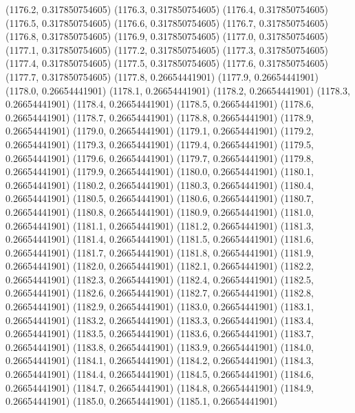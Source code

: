 {					(1176.2, 0.317850754605)
					(1176.3, 0.317850754605)
					(1176.4, 0.317850754605)
					(1176.5, 0.317850754605)
					(1176.6, 0.317850754605)
					(1176.7, 0.317850754605)
					(1176.8, 0.317850754605)
					(1176.9, 0.317850754605)
					(1177.0, 0.317850754605)
					(1177.1, 0.317850754605)
					(1177.2, 0.317850754605)
					(1177.3, 0.317850754605)
					(1177.4, 0.317850754605)
					(1177.5, 0.317850754605)
					(1177.6, 0.317850754605)
					(1177.7, 0.317850754605)
					(1177.8, 0.26654441901)
					(1177.9, 0.26654441901)
					(1178.0, 0.26654441901)
					(1178.1, 0.26654441901)
					(1178.2, 0.26654441901)
					(1178.3, 0.26654441901)
					(1178.4, 0.26654441901)
					(1178.5, 0.26654441901)
					(1178.6, 0.26654441901)
					(1178.7, 0.26654441901)
					(1178.8, 0.26654441901)
					(1178.9, 0.26654441901)
					(1179.0, 0.26654441901)
					(1179.1, 0.26654441901)
					(1179.2, 0.26654441901)
					(1179.3, 0.26654441901)
					(1179.4, 0.26654441901)
					(1179.5, 0.26654441901)
					(1179.6, 0.26654441901)
					(1179.7, 0.26654441901)
					(1179.8, 0.26654441901)
					(1179.9, 0.26654441901)
					(1180.0, 0.26654441901)
					(1180.1, 0.26654441901)
					(1180.2, 0.26654441901)
					(1180.3, 0.26654441901)
					(1180.4, 0.26654441901)
					(1180.5, 0.26654441901)
					(1180.6, 0.26654441901)
					(1180.7, 0.26654441901)
					(1180.8, 0.26654441901)
					(1180.9, 0.26654441901)
					(1181.0, 0.26654441901)
					(1181.1, 0.26654441901)
					(1181.2, 0.26654441901)
					(1181.3, 0.26654441901)
					(1181.4, 0.26654441901)
					(1181.5, 0.26654441901)
					(1181.6, 0.26654441901)
					(1181.7, 0.26654441901)
					(1181.8, 0.26654441901)
					(1181.9, 0.26654441901)
					(1182.0, 0.26654441901)
					(1182.1, 0.26654441901)
					(1182.2, 0.26654441901)
					(1182.3, 0.26654441901)
					(1182.4, 0.26654441901)
					(1182.5, 0.26654441901)
					(1182.6, 0.26654441901)
					(1182.7, 0.26654441901)
					(1182.8, 0.26654441901)
					(1182.9, 0.26654441901)
					(1183.0, 0.26654441901)
					(1183.1, 0.26654441901)
					(1183.2, 0.26654441901)
					(1183.3, 0.26654441901)
					(1183.4, 0.26654441901)
					(1183.5, 0.26654441901)
					(1183.6, 0.26654441901)
					(1183.7, 0.26654441901)
					(1183.8, 0.26654441901)
					(1183.9, 0.26654441901)
					(1184.0, 0.26654441901)
					(1184.1, 0.26654441901)
					(1184.2, 0.26654441901)
					(1184.3, 0.26654441901)
					(1184.4, 0.26654441901)
					(1184.5, 0.26654441901)
					(1184.6, 0.26654441901)
					(1184.7, 0.26654441901)
					(1184.8, 0.26654441901)
					(1184.9, 0.26654441901)
					(1185.0, 0.26654441901)
					(1185.1, 0.26654441901)
}
